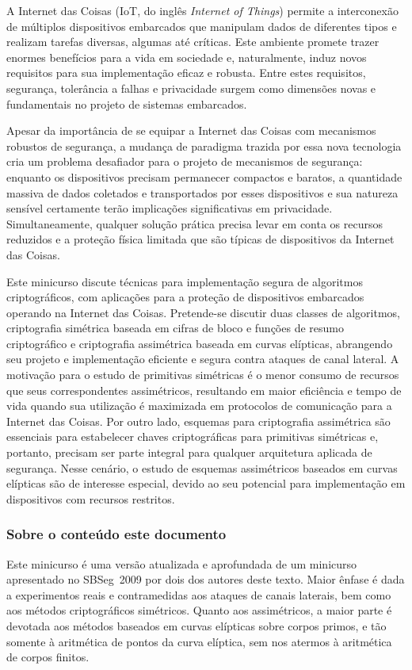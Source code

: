 \documentclass{SBCbookchapter}
\begin{document}
A Internet das Coisas (IoT, do inglês \emph{Internet of Things}) permite a interconexão de múltiplos dispositivos embarcados que manipulam dados de diferentes tipos e realizam tarefas diversas, algumas até críticas. Este ambiente promete trazer enormes benefícios para a vida em sociedade e, naturalmente, induz novos requisitos para sua implementação eficaz e robusta. Entre estes requisitos, segurança, tolerância a falhas e privacidade surgem como dimensões novas e fundamentais no projeto de sistemas embarcados.

Apesar da importância de se equipar a Internet das Coisas com mecanismos robustos de segurança, a mudança de paradigma trazida por essa nova tecnologia cria um problema desafiador para o projeto de mecanismos de segurança: enquanto os dispositivos precisam permanecer compactos e baratos, a quantidade massiva de dados coletados e transportados por esses dispositivos e sua natureza sensível certamente terão implicações significativas em privacidade. Simultaneamente, qualquer solução prática precisa levar em conta os recursos reduzidos e a proteção física limitada que são típicas de dispositivos da Internet das Coisas.

Este minicurso discute técnicas para implementação segura de algoritmos criptográficos, com aplicações para a proteção de dispositivos embarcados operando na Internet das Coisas. Pretende-se discutir duas classes de algoritmos, criptografia simétrica baseada em cifras de bloco e funções de resumo criptográfico e criptografia assimétrica baseada em curvas elípticas, abrangendo seu projeto e implementação eficiente e segura contra ataques de canal lateral. A motivação para o estudo de primitivas simétricas é o menor consumo de recursos que seus correspondentes assimétricos, resultando em maior eficiência e tempo de vida quando sua utilização é maximizada em protocolos de comunicação para a Internet das Coisas. Por outro lado, esquemas para criptografia assimétrica são essenciais para estabelecer chaves criptográficas para primitivas simétricas e, portanto, precisam ser parte integral para qualquer arquitetura aplicada de segurança. Nesse cenário, o estudo de esquemas assimétricos baseados em curvas elípticas são de interesse especial, devido ao seu potencial para implementação em dispositivos com recursos restritos.

\subsubsection*{Sobre o conteúdo este documento}
Este minicurso é uma versão atualizada e aprofundada de um minicurso apresentado no SBSeg~2009 por dois dos autores deste texto. Maior ênfase é dada a experimentos reais e contramedidas aos ataques de canais laterais, bem como aos métodos criptográficos simétricos. Quanto aos assimétricos, a maior parte é devotada aos métodos baseados em curvas elípticas sobre corpos primos, e tão somente à aritmética de pontos da curva elíptica, sem nos atermos à aritmética de corpos finitos.
\end{document}
